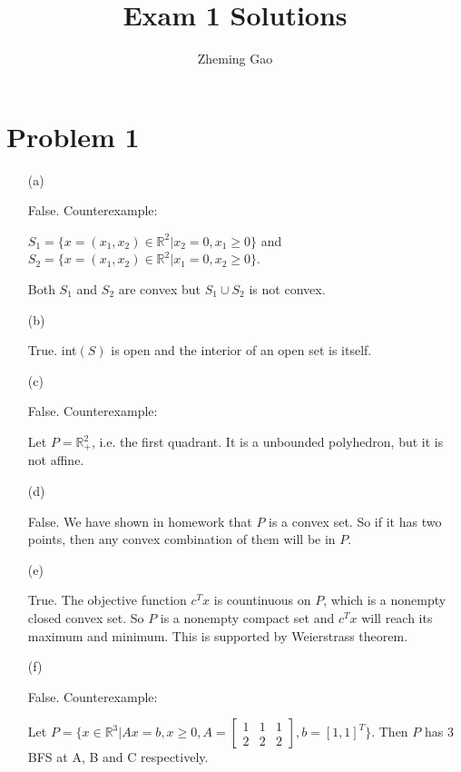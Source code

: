 \documentclass[12pt]{article}
\begin{document}
 
 
\title{Exam 1 Solutions}
\author{Zheming Gao}
\maketitle

\section*{Problem 1}

\begin{enumerate}
\item [(a)]

False. Counterexample:

$S_1 = \{ x = (x_1, x_2) \in \mathbb R^2 | x_2 = 0, x_1 \geqslant 0\}$ and $S_2 = \{ x = (x_1, x_2) \in \mathbb R^2 | x_1 = 0, x_2 \geqslant 0\}$.

Both $S_1$ and $S_2$ are convex but $S_1 \cup S_2$ is not convex.

\item[(b)]

True. int$(S)$ is open and the interior of an open set is itself.

\item [(c)]

False. Counterexample:

Let $P = \mathbb R_+^2$, i.e. the first quadrant. It is a unbounded polyhedron, but it is not affine. 

\item[(d)]

False. We have shown in homework that $P$ is a convex set. So if it has two points, then any convex combination of them will be in $P$.

\item[(e)]

True. The objective function $c^Tx$ is countinuous on $P$, which is a nonempty closed convex set. So $P$ is a nonempty compact set and $c^Tx$ will reach its maximum and minimum. This is supported by Weierstrass theorem.

\item[(f)]

False. Counterexample:

Let $P = \{x\in\mathbb{R}^3 | Ax=b, x\geqslant 0, A = \begin{bmatrix}
1 & 1 & 1 \\
2 & 2 & 2 
\end{bmatrix}, b = [1,1]^T \}$. Then $P$ has 3 BFS at A, B and C respectively.


\end{enumerate}
\end{document}

